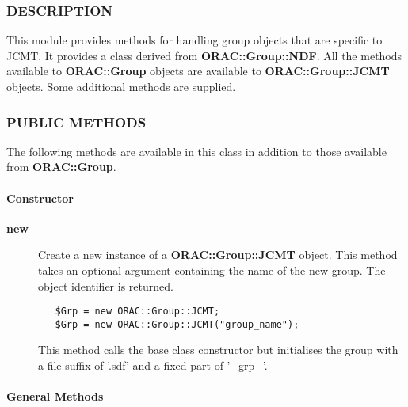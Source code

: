 \begin{description}
\subsubsection*{DESCRIPTION\label{ORAC::Group::JCMT_DESCRIPTION}}


This module provides methods for handling group objects that
are specific to JCMT. It provides a class derived from \textbf{ORAC::Group::NDF}.
All the methods available to \textbf{ORAC::Group} objects are available
to \textbf{ORAC::Group::JCMT} objects. Some additional methods are supplied.

\subsubsection*{PUBLIC METHODS\label{ORAC::Group::JCMT_PUBLIC_METHODS}}


The following methods are available in this class in addition to
those available from \textbf{ORAC::Group}.

\paragraph*{Constructor\label{ORAC::Group::JCMT_Constructor}}
\begin{description}

\item[{\textbf{new}}] \mbox{}

Create a new instance of a \textbf{ORAC::Group::JCMT} object.
This method takes an optional argument containing the
name of the new group. The object identifier is returned.

\begin{verbatim}
   $Grp = new ORAC::Group::JCMT;
   $Grp = new ORAC::Group::JCMT("group_name");
\end{verbatim}


This method calls the base class constructor but initialises
the group with a file suffix of '.sdf' and a fixed part
of '\_grp\_'.

\end{description}
\paragraph*{General Methods\label{ORAC::Group::JCMT_General_Methods}}
\begin{description}


\end{description}
\end{description}
